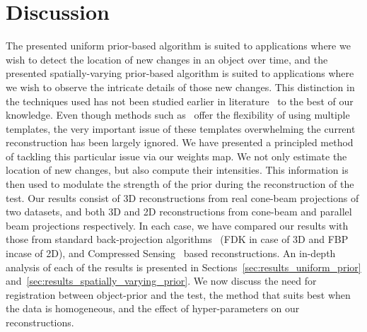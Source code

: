 \documentclass[journal]{IEEEtran}
\begin{document}


\section{Discussion}
\label{sec:discussion}
The presented uniform prior-based algorithm is suited to applications
where we wish to detect the location of new changes in an object over
time, and the presented spatially-varying prior-based algorithm is
suited to applications where we wish to observe the intricate details
of those new changes. This distinction in the techniques used has not
been studied earlier in
literature~\cite{geyer2015,PICCS,Ali2018,Tan2017} to the best of our
knowledge. Even though methods such as~\cite{Hakka2019} offer the flexibility of using multiple templates, the very important issue of these templates overwhelming the current reconstruction has been largely ignored. We have presented a principled method of tackling this particular issue via our weights map. We not only estimate the location of new changes, but also compute their intensities. This information is then used to modulate the strength of the prior during the reconstruction of the test. Our results consist of 3D reconstructions from real cone-beam projections of two datasets, and both 3D and 2D reconstructions from cone-beam and parallel beam projections respectively. In each case, we have compared our results with those from standard back-projection algorithms~\cite{Pan2009} (FDK in case of 3D and FBP incase of 2D), and Compressed Sensing~\cite{Donoho,introCS} based reconstructions. An in-depth analysis of each of the results is presented in Sections~\ref{sec:results_uniform_prior} and~\ref{sec:results_spatially_varying_prior}. We now discuss the need for registration between object-prior and the test, the method that suits best when the data is homogeneous, and the effect of hyper-parameters on our reconstructions.
\end{document}
